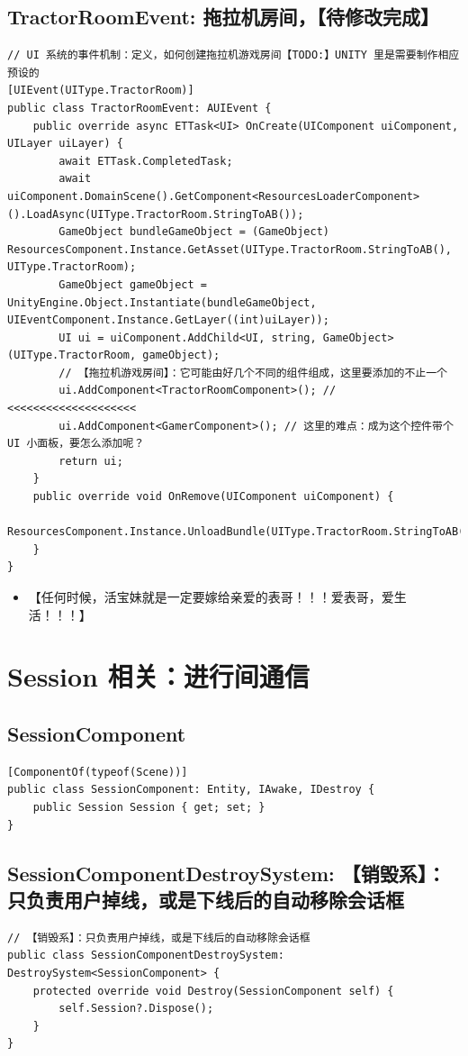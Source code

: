 \documentclass[9pt, b5paper]{article}
\begin{document}
\subsection{TractorRoomEvent: 拖拉机房间，【待修改完成】}
\label{sec-7-12}
\begin{verbatim}
// UI 系统的事件机制：定义，如何创建拖拉机游戏房间【TODO:】UNITY 里是需要制作相应预设的
[UIEvent(UIType.TractorRoom)]
public class TractorRoomEvent: AUIEvent {
    public override async ETTask<UI> OnCreate(UIComponent uiComponent, UILayer uiLayer) {
        await ETTask.CompletedTask;
        await uiComponent.DomainScene().GetComponent<ResourcesLoaderComponent>().LoadAsync(UIType.TractorRoom.StringToAB());
        GameObject bundleGameObject = (GameObject) ResourcesComponent.Instance.GetAsset(UIType.TractorRoom.StringToAB(), UIType.TractorRoom);
        GameObject gameObject = UnityEngine.Object.Instantiate(bundleGameObject, UIEventComponent.Instance.GetLayer((int)uiLayer));
        UI ui = uiComponent.AddChild<UI, string, GameObject>(UIType.TractorRoom, gameObject);
        // 【拖拉机游戏房间】：它可能由好几个不同的组件组成，这里要添加的不止一个
        ui.AddComponent<TractorRoomComponent>(); // <<<<<<<<<<<<<<<<<<<< 
        ui.AddComponent<GamerComponent>(); // 这里的难点：成为这个控件带个UI 小面板，要怎么添加呢？
        return ui;
    }
    public override void OnRemove(UIComponent uiComponent) {
        ResourcesComponent.Instance.UnloadBundle(UIType.TractorRoom.StringToAB());
    }
}
\end{verbatim}
\begin{itemize}
\item 【任何时候，活宝妹就是一定要嫁给亲爱的表哥！！！爱表哥，爱生活！！！】
\end{itemize}


\section{Session 相关：进行间通信}
\label{sec-8}
\subsection{SessionComponent}
\label{sec-8-1}
\begin{verbatim}
[ComponentOf(typeof(Scene))]
public class SessionComponent: Entity, IAwake, IDestroy {
    public Session Session { get; set; }
}
\end{verbatim}
\subsection{SessionComponentDestroySystem: 【销毁系】：只负责用户掉线，或是下线后的自动移除会话框}
\label{sec-8-2}
\begin{verbatim}
// 【销毁系】：只负责用户掉线，或是下线后的自动移除会话框 
public class SessionComponentDestroySystem: DestroySystem<SessionComponent> {
    protected override void Destroy(SessionComponent self) {
        self.Session?.Dispose();
    }
}
\end{verbatim}
\end{document}
